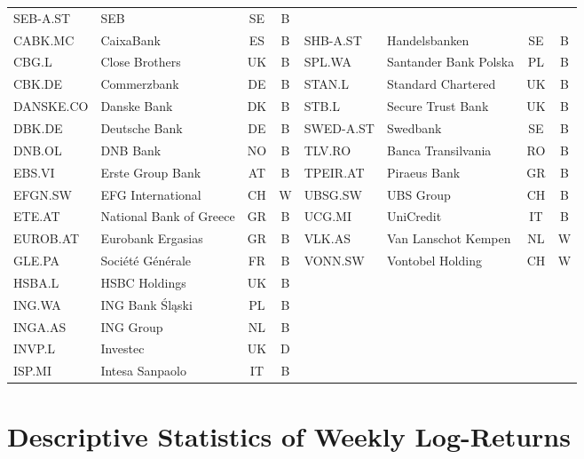 \documentclass[12pt,a4paper]{article}
\begin{document}
\begin{center}
\begin{tabular}{llcc|llcc}
SEB-A.ST & SEB                    & SE & B \\
CABK.MC  & CaixaBank              & ES & B &
SHB-A.ST & Handelsbanken          & SE & B \\
CBG.L    & Close Brothers         & UK & B &
SPL.WA   & Santander Bank Polska  & PL & B \\
CBK.DE   & Commerzbank            & DE & B &
STAN.L   & Standard Chartered     & UK & B \\
DANSKE.CO& Danske Bank            & DK & B &
STB.L    & Secure Trust Bank      & UK & B \\
DBK.DE   & Deutsche Bank          & DE & B &
SWED-A.ST& Swedbank               & SE & B \\
DNB.OL   & DNB Bank               & NO & B &
TLV.RO   & Banca Transilvania     & RO & B \\
EBS.VI   & Erste Group Bank       & AT & B &
TPEIR.AT & Piraeus Bank           & GR & B \\
EFGN.SW  & EFG International      & CH & W &
UBSG.SW  & UBS Group              & CH & B \\
ETE.AT   & National Bank of Greece& GR & B &
UCG.MI   & UniCredit              & IT & B \\
EUROB.AT & Eurobank Ergasias      & GR & B &
VLK.AS   & Van Lanschot Kempen    & NL & W \\
GLE.PA   & Société Générale       & FR & B &
VONN.SW  & Vontobel Holding       & CH & W \\
HSBA.L   & HSBC Holdings          & UK & B &
           &                       &    &   \\
ING.WA   & ING Bank Śląski        & PL & B &
           &                       &    &   \\
INGA.AS  & ING Group              & NL & B &
           &                       &    &   \\
INVP.L   & Investec               & UK & D &
           &                       &    &   \\
ISP.MI   & Intesa Sanpaolo        & IT & B &
           &                       &    &   \\
\hline
\end{tabular}
\end{center}

\section{Descriptive Statistics of Weekly Log-Returns}\label{app:sumstats}
\end{document}
